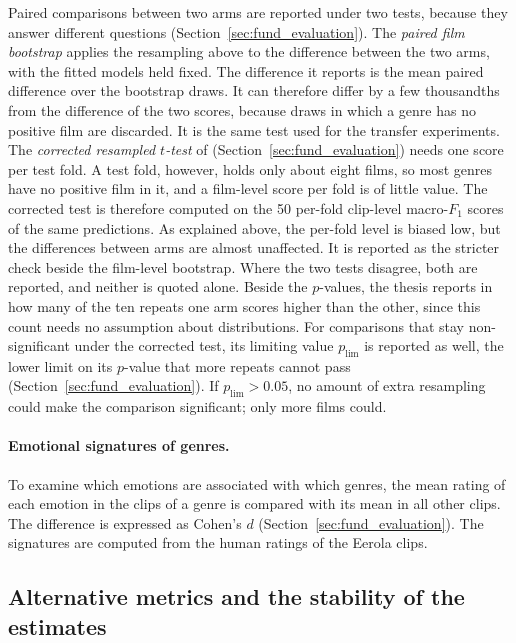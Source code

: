 Paired comparisons between two arms are reported under two tests, because they answer different questions (Section~\ref{sec:fund_evaluation}). The \emph{paired film bootstrap} applies the resampling above to the difference between the two arms, with the fitted models held fixed. The difference it reports is the mean paired difference over the bootstrap draws. It can therefore differ by a few thousandths from the difference of the two scores, because draws in which a genre has no positive film are discarded. It is the same test used for the transfer experiments. The \emph{corrected resampled $t$-test} of \citet{nadeau2003inference} (Section~\ref{sec:fund_evaluation}) needs one score per test fold. A test fold, however, holds only about eight films, so most genres have no positive film in it, and a film-level score per fold is of little value. The corrected test is therefore computed on the 50 per-fold clip-level macro-$F_1$ scores of the same predictions. As explained above, the per-fold level is biased low, but the differences between arms are almost unaffected. It is reported as the stricter check beside the film-level bootstrap. Where the two tests disagree, both are reported, and neither is quoted alone. Beside the $p$-values, the thesis reports in how many of the ten repeats one arm scores higher than the other, since this count needs no assumption about distributions. For comparisons that stay non-significant under the corrected test, its limiting value $p_{\lim}$ is reported as well, the lower limit on its $p$-value that more repeats cannot pass (Section~\ref{sec:fund_evaluation}). If $p_{\lim} > 0.05$, no amount of extra resampling could make the comparison significant; only more films could.

\paragraph{Emotional signatures of genres.} To examine which emotions are associated with which genres, the mean rating of each emotion in the clips of a genre is compared with its mean in all other clips. The difference is expressed as Cohen's $d$ (Section~\ref{sec:fund_evaluation}). The signatures are computed from the human ratings of the Eerola clips.

\subsection{Alternative metrics and the stability of the estimates}
\label{subsec:protocol_altmetrics}

